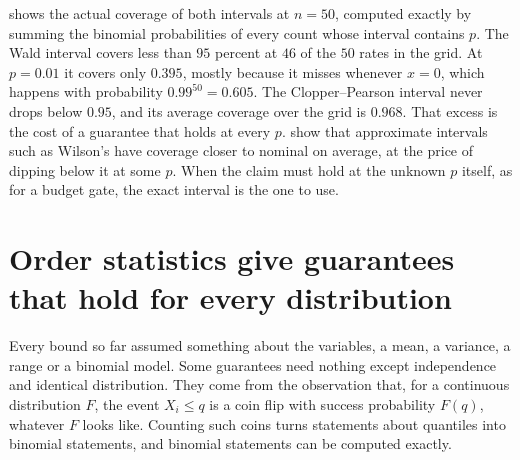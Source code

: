  shows the actual coverage of both intervals at $n=50$, computed exactly by summing the binomial probabilities of every count whose interval contains $p$. The Wald interval covers less than $95$ percent at $46$ of the $50$ rates in the grid. At $p=0.01$ it covers only $0.395$, mostly because it misses whenever $x=0$, which happens with probability $0.99^{50}=0.605$. The Clopper--Pearson interval never drops below $0.95$, and its average coverage over the grid is $0.968$. That excess is the cost of a guarantee that holds at every $p$. \citet{agresti1998} show that approximate intervals such as Wilson's have coverage closer to nominal on average, at the price of dipping below it at some $p$. When the claim must hold at the unknown $p$ itself, as for a budget gate, the exact interval is the one to use.



\section{Order statistics give guarantees that hold for every distribution}\label{sec:ch12:order}

Every bound so far assumed something about the variables, a mean, a variance, a range or a binomial model. Some guarantees need nothing except independence and identical distribution. They come from the observation that, for a continuous distribution $F$, the event $X_i\le q$ is a coin flip with success probability $F(q)$, whatever $F$ looks like. Counting such coins turns statements about quantiles into binomial statements, and binomial statements can be computed exactly.

